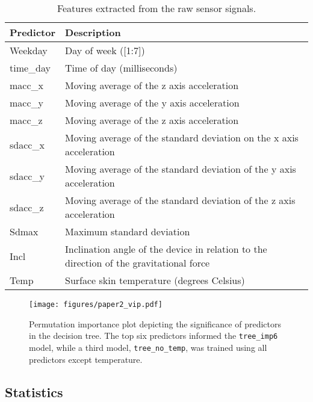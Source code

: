 \documentclass[
  10pt,
]{scrbook}
\begin{document}
\begingroup

\footnotesize

\hypertarget{tbl-8}{}
\begin{longtable}{ll}
\caption{\label{tbl-8}Features extracted from the raw sensor signals. }\tabularnewline

\toprule
Predictor & Description \\ 
\midrule
Weekday & Day of week ([1:7]) \\ 
time\_day & Time of day (milliseconds) \\ 
macc\_x & Moving average of the z axis acceleration \\ 
macc\_y & Moving average of the y axis acceleration \\ 
macc\_z & Moving average of the z axis acceleration \\ 
sdacc\_x & Moving average of the standard deviation on the x axis acceleration \\ 
sdacc\_y & Moving average of the standard deviation of the y axis acceleration \\ 
sdacc\_z & Moving average of the standard deviation of the z axis acceleration \\ 
Sdmax & Maximum standard deviation \\ 
Incl & Inclination angle of the device in relation to the direction of the gravitational force \\ 
Temp & Surface skin temperature (degrees Celsius) \\ 
\bottomrule
\end{longtable}

\endgroup

\begin{figure}

{\centering \texttt{[image: figures/paper2\_vip.pdf]}

}

\caption{\label{fig-importance}Permutation importance plot depicting the
significance of predictors in the decision tree. The top six predictors
informed the \texttt{tree\_imp6} model, while a third model,
\texttt{tree\_no\_temp}, was trained using all predictors except
temperature.}

\end{figure}

\hypertarget{statistics-1}{%
\subsection{Statistics}\label{statistics-1}}
\end{document}

